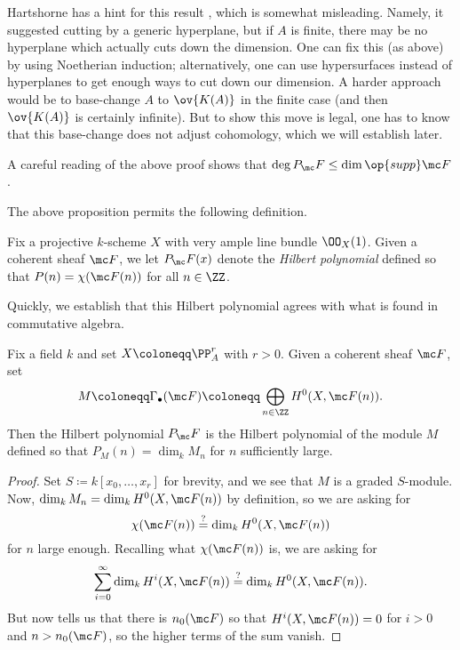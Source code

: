 \documentclass[../notes.tex]{subfiles}
\begin{document}
\begin{remark}
	Hartshorne has a hint for this result \cite[Exercise~III.5.2]{hartshorne}, which is somewhat misleading. Namely, it suggested cutting by a generic hyperplane, but if $A$ is finite, there may be no hyperplane which actually cuts down the dimension. One can fix this (as above) by using Noetherian induction; alternatively, one can use hypersurfaces instead of hyperplanes to get enough ways to cut down our dimension. A harder approach would be to base-change $A$ to $\ov{K(A)}$ in the finite case (and then $\ov{K(A)}$ is certainly infinite). But to show this move is legal, one has to know that this base-change does not adjust cohomology, which we will establish later.
\end{remark}
\begin{remark}
	A careful reading of the above proof shows that $\deg P_\mc F\le\dim\op{supp}\mc F$.
\end{remark}
The above proposition permits the following definition.
\begin{definition}
	Fix a projective $k$-scheme $X$ with very ample line bundle $\OO_X(1)$. Given a coherent sheaf $\mc F$, we let $P_\mc F(x)$ denote the \textit{Hilbert polynomial} defined so that $P(n)=\chi(\mc F(n))$ for all $n\in\ZZ$.
\end{definition}
Quickly, we establish that this Hilbert polynomial agrees with what is found in commutative algebra.
\begin{corollary}
	Fix a field $k$ and set $X\coloneqq\PP^r_A$ with $r>0$. Given a coherent sheaf $\mc F$, set
	\[M\coloneqq\Gamma_\bullet(\mc F)\coloneqq\bigoplus_{n\in\ZZ}H^0(X,\mc F(n)).\]
	Then the Hilbert polynomial $P_\mc F$ is the Hilbert polynomial of the module $M$ defined so that $P_M(n)=\dim_kM_n$ for $n$ sufficiently large.
\end{corollary}
\begin{proof}
	Set $S\coloneqq k[x_0,\ldots,x_r]$ for brevity, and we see that $M$ is a graded $S$-module. Now, $\dim_kM_n=\dim_kH^0(X,\mc F(n))$ by definition, so we are asking for
	\[\chi(\mc F(n))\stackrel?=\dim_kH^0(X,\mc F(n))\]
	for $n$ large enough. Recalling what $\chi(\mc F(n))$ is, we are asking for
	\[\sum_{i=0}^\infty\dim_kH^i(X,\mc F(n))\stackrel?=\dim_kH^0(X,\mc F(n)).\]
	But now  tells us that there is $n_0(\mc F)$ so that $H^i(X,\mc F(n))=0$ for $i>0$ and $n>n_0(\mc F)$, so the higher terms of the sum vanish.
\end{proof}
\end{document}
